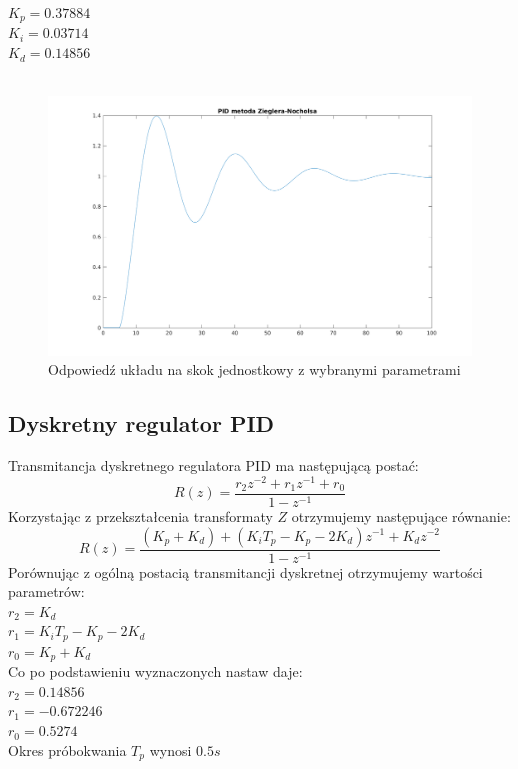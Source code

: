 \documentclass[a4paper, 11pt]{article}
\begin{document}
$K_p = 0.37884$\\
\indent$K_i = 0.03714$\\
\indent$K_d = 0.14856$\\
\\

\begin{figure}[htp]
\centering
\includegraphics[scale=0.60]{2_1.png}
\caption{Odpowiedź układu na skok jednostkowy z wybranymi parametrami}
\label{skok}
\end{figure}

\subsection{Dyskretny regulator PID}
Transmitancja dyskretnego regulatora PID ma następującą postać: 
$$R(z) = \frac{r_2z^{-2} + r_1z^{-1} + r_0}{1-z^{-1}}$$
Korzystając z przekształcenia transformaty $Z$ otrzymujemy następujące równanie: 
$$R(z) = \frac{(K_p+K_d)+(K_iT_p-K_p-2K_d)z^{-1} + K_dz^{-2}}{1-z^{-1}}$$
Porównując z ogólną postacią transmitancji dyskretnej otrzymujemy wartości parametrów: \\

$r_2 = K_d$\\
\indent$r_1 = K_iT_p -K_p-2K_d$\\
\indent$r_0 = K_p + K_d$\\

\noindent Co po podstawieniu wyznaczonych nastaw daje: \\

$r_2 = 0.14856$\\ 
\indent $r_1 = -0.672246$\\
\indent $r_0 = 0.5274$\\

Okres próbokwania $T_p$ wynosi $0.5s$
\end{document}
